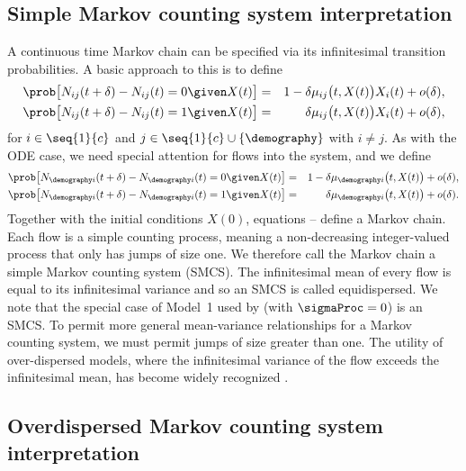 \subsection{Simple Markov counting system interpretation}
\label{subsec:smcs}
A continuous time Markov chain can be specified via its infinitesimal transition probabilities.
A basic approach to this is to define
\begin{eqnarray}
\label{eq:smcs1}
\prob\big[ N_{ij}(t+\delta)-N_{ij}(t)=0 \given X(t)\big]
 &=& 1-\delta \mu_{ij}\big(t,X(t)\big)X_i(t) + o(\delta),
\\
\label{eq:smcs2}
\prob\big[ N_{ij}(t+\delta)-N_{ij}(t)=1 \given X(t)\big]
 &=& \delta \mu_{ij}\big(t,X(t)\big)X_i(t) + o(\delta),
\end{eqnarray}
for $i\in \seq{1}{c}$ and $j\in\seq{1}{c}\cup\{\demography\}$ with $i\neq j$.
As with the ODE case, we need special attention for flows into the system, and we define
\begin{eqnarray}
\label{eq:smcs3}
\prob\big[ N_{\demography i}(t+\delta)-N_{\demography i}(t)=0 \given X(t)\big]
 &=& 1-\delta \mu_{\demography i}\big(t,X(t)\big) + o(\delta),
\\
\label{eq:smcs4}
\prob\big[ N_{\demography i}(t+\delta)-N_{\demography i}(t)=1 \given X(t)\big]
 &=& \delta \mu_{\demography i}\big(t,X(t)\big) + o(\delta).
\end{eqnarray}
Together with the initial conditions $X(0)$, equations -- define a Markov chain.
Each flow is a simple counting process, meaning a non-decreasing integer-valued process that only has jumps of size one.
We therefore call the Markov chain a simple Markov counting system (SMCS).
The infinitesimal mean of every flow is equal to its infinitesimal variance \citep{breto11} and so an SMCS is called equidispersed.
We note that the special case of Model~1 used by \cite{lee20} (with $\sigmaProc = 0$) is an SMCS.
To permit more general mean-variance relationships for a Markov counting system, we must permit jumps of size greater than one.
The utility of over-dispersed models, where the infinitesimal variance of the flow exceeds the infinitesimal mean, has become widely recognized \citep{stocks20,he10}.

\subsection{Overdispersed Markov counting system interpretation}
\label{subsec:odmcs}

